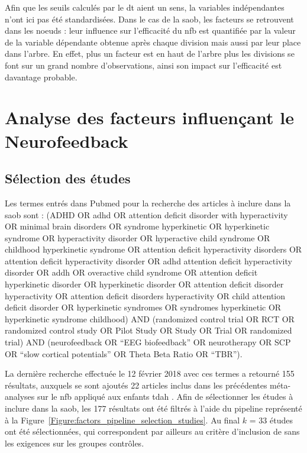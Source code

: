 Afin que les seuils calculés par le \gls{dt} aient un sens, la variables indépendantes n'ont ici pas été standardisées. Dans le cas de la \gls{saob}, 
les facteurs se retrouvent dans les noeuds : leur influence sur l'efficacité du \gls{nfb} est quantifiée par la valeur de la variable dépendante 
obtenue après chaque division mais aussi par leur place dans l'arbre. En effet, plus un facteur est en haut de l'arbre plus les divisions se font sur un grand nombre
d'observations, ainsi son impact sur l'efficacité est davantage probable.

\section{Analyse des facteurs influençant le Neurofeedback}

\subsection{Sélection des études}

Les termes entrés dans Pubmed pour la recherche des articles à inclure dans la \gls{saob} sont :
(ADHD OR adhd OR attention deficit disorder with hyperactivity OR minimal brain disorders OR syndrome hyperkinetic OR hyperkinetic
 syndrome OR hyperactivity disorder OR hyperactive child syndrome OR childhood hyperkinetic syndrome OR attention deficit hyperactivity disorders
 OR attention deficit hyperactivity disorder OR adhd attention deficit hyperactivity disorder OR addh OR overactive child syndrome OR attention deficit 
hyperkinetic disorder OR hyperkinetic disorder OR attention deficit disorder hyperactivity OR attention deficit disorders hyperactivity OR child 
attention deficit disorder OR hyperkinetic syndromes OR syndromes hyperkinetic OR hyperkinetic syndrome childhood) AND 
(randomized control trial OR RCT OR randomized control study OR Pilot Study OR Study OR Trial OR randomized trial) AND 
(neurofeedback OR “EEG biofeedback” OR neurotherapy OR SCP OR “slow cortical potentials” OR Theta Beta Ratio OR “TBR”). 

La dernière recherche effectuée le 12 février 2018 avec ces termes a retourné 155 résultats, auxquels se sont ajoutés 22 articles inclus dans les précédentes 
méta-analyses sur le \gls{nfb} appliqué aux enfants \gls{tdah} \citep{Arns2009, Sonuga-Barke2013, Micoulaud2014, Cortese2016, Catala2017}. Afin de sélectionner
les études à inclure dans la \gls{saob}, les 177 résultats ont été filtrés à l'aide du pipeline représenté à la 
Figure~\ref{Figure:factors_pipeline_selection_studies}. Au final $k$ = 33 études ont été sélectionnées, qui correspondent par ailleurs au critère d'inclusion de
\citet{Cortese2016} sans les exigences sur les groupes contrôles. 

